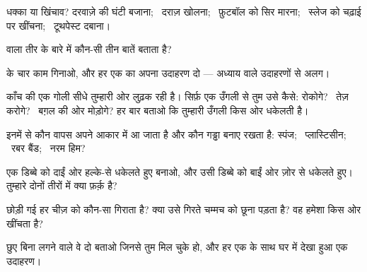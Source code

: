 \begin{exercise}[$\star$]\label{exo:g2:pushes-and-pulls:1}
धक्का या खिंचाव? दरवाज़े की घंटी बजाना; \ दराज़ खोलना; \ फ़ुटबॉल को
सिर मारना; \ स्लेज को चढ़ाई पर खींचना; \ टूथपेस्ट दबाना।
\end{exercise}

\begin{exercise}[$\star$]\label{exo:g2:pushes-and-pulls:2}
 वाला तीर  के बारे में कौन-सी तीन बातें बताता है?
\end{exercise}

\begin{exercise}[$\star$]\label{exo:g2:pushes-and-pulls:3}
 के चार काम गिनाओ, और हर एक का अपना उदाहरण दो --- अध्याय वाले
उदाहरणों से अलग।
\end{exercise}

\begin{exercise}[$\star$]\label{exo:g2:pushes-and-pulls:4}
काँच की एक गोली सीधे तुम्हारी ओर लुढ़क रही है। सिर्फ़ एक उँगली से तुम
उसे कैसे: रोकोगे? \ तेज़ करोगे? \ बग़ल की ओर मोड़ोगे? हर बार बताओ कि
तुम्हारी उँगली किस ओर धकेलती है।
\end{exercise}

\begin{exercise}[$\star$]\label{exo:g2:pushes-and-pulls:5}
इनमें से कौन वापस अपने आकार में आ जाता है और कौन गड्ढा बनाए रखता है:
स्पंज; \ प्लास्टिसीन; \ रबर बैंड; \ नरम हिम?
\end{exercise}

\begin{exercise}[$\star$]\label{exo:g2:pushes-and-pulls:6}
एक डिब्बे को दाईं ओर हल्के-से धकेलते हुए बनाओ, और उसी डिब्बे को बाईं
ओर ज़ोर से धकेलते हुए। तुम्हारे दोनों तीरों में क्या फ़र्क़ है?
\end{exercise}

\begin{exercise}[$\star$]\label{exo:g2:pushes-and-pulls:7}
छोड़ी गई हर चीज़ को कौन-सा  गिराता है? क्या उसे गिरते चम्मच को
छूना पड़ता है? वह हमेशा किस ओर खींचता है?
\end{exercise}

\begin{exercise}[$\star$]\label{exo:g2:pushes-and-pulls:8}
छुए बिना लगने वाले वे दो  बताओ जिनसे तुम मिल चुके हो, और हर एक के
साथ घर में देखा हुआ एक उदाहरण।
\end{exercise}

